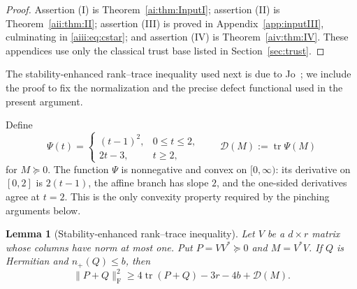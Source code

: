 \documentclass[11pt]{article}
\newtheorem{lemma}[theorem]{Lemma}
\DeclareMathOperator{\tr}{tr}
\newcommand{\Frob}{\mathrm F}
\newcommand{\cD}{\mathcal D}
\begin{document}
\begin{proof}
Assertion (I) is Theorem~\ref{ai:thm:InputI}; assertion (II) is
Theorem~\ref{aii:thm:II}; assertion (III) is proved in
Appendix~\ref{app:inputIII}, culminating in
\eqref{aiii:eq:cstar}; and assertion (IV) is
Theorem~\ref{aiv:thm:IV}.  These appendices use only the classical trust base
listed in Section~\ref{sec:trust}.
\end{proof}

The stability-enhanced rank--trace inequality used next is due to
Jo~\cite{Jo26}; we include the proof to fix the normalization and the
precise defect functional used in the present argument.

Define
\begin{equation}\label{eq:Psi}
 \Psi(t)=
 \begin{cases}
  (t-1)^2,&0\le t\le2,\\
  2t-3,&t\ge2,
 \end{cases}
 \qquad
 \cD(M):=\tr\Psi(M)
\end{equation}
for $M\succeq0$.  The function $\Psi$ is nonnegative and convex on
$[0,\infty)$: its derivative on $[0,2]$ is $2(t-1)$, the affine branch has
slope $2$, and the one-sided derivatives agree at $t=2$.  This is the only
convexity property required by the pinching arguments below.

\begin{lemma}[Stability-enhanced rank--trace inequality]\label{lem:stable}
Let $V$ be a $d\times r$ matrix whose columns have norm at most one.  Put
$P=VV^*\succeq0$ and $M=V^*V$.  If $Q$ is Hermitian and $n_+(Q)\le b$, then
\begin{equation}\label{eq:stable}
 \|P+Q\|_{\Frob}^2
 \ge 4\tr(P+Q)-3r-4b+\cD(M).
\end{equation}
\end{lemma}
\end{document}
